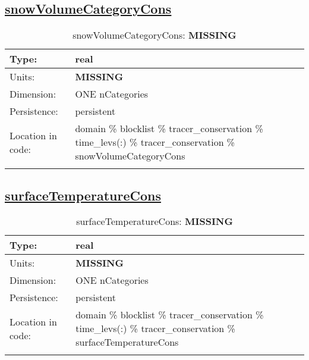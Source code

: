 \subsection[snowVolumeCategoryCons]{\hyperref[sec:var_tab_tracer_conservation]{snowVolumeCategoryCons}}
\label{subsec:var_sec_tracer_conservation_snowVolumeCategoryCons}
\begin{center}
\begin{longtable}{| p{2.0in} | p{4.0in} |}
        \hline 
        Type: & real \\
        \hline 
        Units: & {\bf \color{red} MISSING} \\
        \hline 
        Dimension: & ONE nCategories \\
        \hline 
        Persistence: & persistent \\
        \hline 
         Location in code: & domain \% blocklist \% tracer\_conservation \% time\_levs(:) \% tracer\_conservation \% snowVolumeCategoryCons \\
         \hline 
    \caption{snowVolumeCategoryCons: {\bf \color{red} MISSING}}
\end{longtable}
\end{center}
\subsection[surfaceTemperatureCons]{\hyperref[sec:var_tab_tracer_conservation]{surfaceTemperatureCons}}
\label{subsec:var_sec_tracer_conservation_surfaceTemperatureCons}
\begin{center}
\begin{longtable}{| p{2.0in} | p{4.0in} |}
        \hline 
        Type: & real \\
        \hline 
        Units: & {\bf \color{red} MISSING} \\
        \hline 
        Dimension: & ONE nCategories \\
        \hline 
        Persistence: & persistent \\
        \hline 
         Location in code: & domain \% blocklist \% tracer\_conservation \% time\_levs(:) \% tracer\_conservation \% surfaceTemperatureCons \\
         \hline 
    \caption{surfaceTemperatureCons: {\bf \color{red} MISSING}}
\end{longtable}
\end{center}
